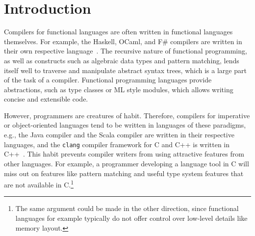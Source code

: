 \documentclass[sigplan,screen]{acmart}
\begin{document}



\maketitle

\section{Introduction}

Compilers for functional languages are
often written in functional languages themselves. For example,
the Haskell, OCaml, and F\# compilers are written in
their own respective language~\cite{GHC, OCaml, FSharp}.
The recursive nature of functional
programming, as well as constructs such as algebraic data types
and pattern matching, lends itself well to traverse and manipulate
abstract syntax trees, which is a large part of the
task of a compiler.
%
Functional programming languages provide
abstractions, such as type classes or ML style modules, which
allows writing concise and extensible code.

However, programmers are creatures of habit. Therefore, compilers for
imperative or object-oriented languages tend to be written in
languages of these paradigms, e.g., the Java compiler
and the Scala compiler are written in their respective languages,
and the \texttt{clang}
compiler framework for C and C++ is written in C++~\cite{javac, scalac, clang}.
%
This habit prevents compiler writers from using attractive features from
other languages.
%
For example, a programmer developing a language tool in C will
miss out on features like pattern matching and useful type system
features that are not available in C.\footnote{The same argument
  could be made in the other direction, since functional languages
  for example typically do not offer control over low-level
  details like memory layout. }
\end{document}

